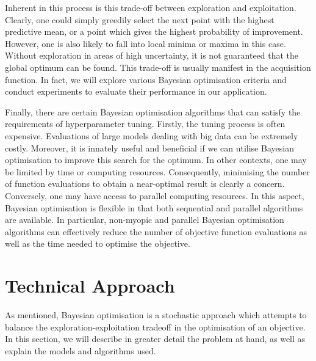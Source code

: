 \documentclass[letterpaper]{article}
\begin{document}
Inherent in this process is this trade-off between exploration and exploitation.
Clearly, one could simply greedily select the next point with the highest predictive
mean, or a point which gives the highest probability of improvement. However, one
is also likely to fall into local minima or maxima in this case. Without exploration
in areas of high uncertainty, it is not guaranteed that the global optimum can be
found. This trade-off is usually manifest in the acquisition function. In fact,
we will explore various Bayesian optimisation criteria and conduct experiments to
evaluate their performance in our application.

Finally, there are certain Bayesian optimisation algorithms that can satisfy the
requirements of hyperparameter tuning. Firstly, the tuning process is often
expensive. Evaluations of large models dealing with big data can be extremely
costly. Moreover, it is innately useful and beneficial if we can utilise
Bayesian optimisation to improve this search for the optimum. In other contexts,
one may be limited by time or computing resources. Consequently, minimising the
number of function evaluations to obtain a near-optimal result is clearly a concern.
Conversely, one may have access to parallel computing resources. In this aspect,
Bayesian optimisation is flexible in that both sequential and parallel algorithms
are available. In particular, non-myopic and parallel Bayesian optimisation
algorithms can effectively reduce the number of objective function evaluations
as well as the time needed to optimise the objective.

\section{Technical Approach}
As mentioned, Bayesian optimisation is a stochastic approach which attempts to
balance the exploration-exploitation tradeoff in the optimisation of an objective.
In this section, we will describe in greater detail the problem at hand, as well
as explain the models and algorithms used.
\end{document}
